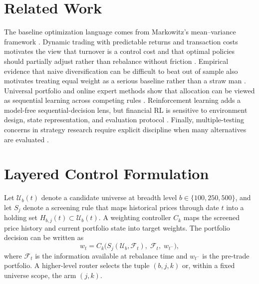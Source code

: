 \documentclass[11pt,a4paper]{article}
\begin{document}
\section{Related Work}
The baseline optimization language comes from Markowitz's mean--variance framework \citep{markowitz1952portfolio}. Dynamic trading with predictable returns and transaction costs motivates the view that turnover is a control cost and that optimal policies should partially adjust rather than rebalance without friction \citep{garleanu2013dynamic}. Empirical evidence that naive diversification can be difficult to beat out of sample also motivates treating equal weight as a serious baseline rather than a straw man \citep{demiguel2009optimal}. Universal portfolio and online expert methods show that allocation can be viewed as sequential learning across competing rules \citep{cover1991universal}. Reinforcement learning adds a model-free sequential-decision lens, but financial RL is sensitive to environment design, state representation, and evaluation protocol \citep{williams1992simple,jiang2017deep,zhang2020deep}. Finally, multiple-testing concerns in strategy research require explicit discipline when many alternatives are evaluated \citep{bailey2014deflated}.

\section{Layered Control Formulation}
Let $\mathcal{U}_b(t)$ denote a candidate universe at breadth level $b \in \{100,250,500\}$, and let $S_j$ denote a screening rule that maps historical prices through date $t$ into a holding set $H_{b,j}(t) \subset \mathcal{U}_b(t)$. A weighting controller $C_k$ maps the screened price history and current portfolio state into target weights. The portfolio decision can be written as
\begin{equation}
w_t = C_k\big(S_j(\mathcal{U}_b, \mathcal{F}_t),\; \mathcal{F}_t,\; w_{t^-}\big),
\label{eq:composition}
\end{equation}
where $\mathcal{F}_t$ is the information available at rebalance time and $w_{t^-}$ is the pre-trade portfolio. A higher-level router selects the tuple $(b,j,k)$ or, within a fixed universe scope, the arm $(j,k)$.
\end{document}

